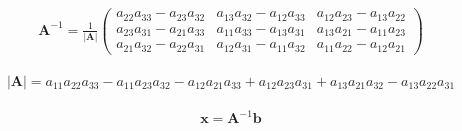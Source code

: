 \documentclass[fleqn,oneside]{article}
\begin{document}
\begin{align*}
\mathbf A^{-1} =
\frac{1}{|\mathbf A|}
\left(\begin{array}{ccc}
	a_{2 2}  a_{3 3} -a_{2 3}  a_{3 2}  & a_{1 3}  a_{3 2} -a_{1 2}  a_{3 3}  & a_{1 2}  a_{2 3} -a_{1 3}  a_{2 2} \\
	a_{2 3}  a_{3 1} -a_{2 1}  a_{3 3}  & a_{1 1}  a_{3 3} -a_{1 3}  a_{3 1}  & a_{1 3}  a_{2 1} -a_{1 1}  a_{2 3} \\
	a_{2 1}  a_{3 2} -a_{2 2}  a_{3 1}  & a_{1 2}  a_{3 1} -a_{1 1}  a_{3 2}  & a_{1 1}  a_{2 2} -a_{1 2}  a_{2 1} 
\end{array}\right)
\end{align*}
	
\begin{align*}
|\mathbf A| = 
a_{1 1}  a_{2 2}  a_{3 3} -a_{1 1}  a_{2 3}  a_{3 2} -a_{1 2}  a_{2 1}  a_{3 3} +a_{1 2}  a_{2 3}  a_{3 1} +a_{1 3}  a_{2 1}  a_{3 2} -a_{1 3}  a_{2 2}  a_{3 1}
\end{align*}


\begin{align*}
	\mathbf{x}= \mathbf{A}^{-1} \mathbf{b}
\end{align*}
\end{document}
